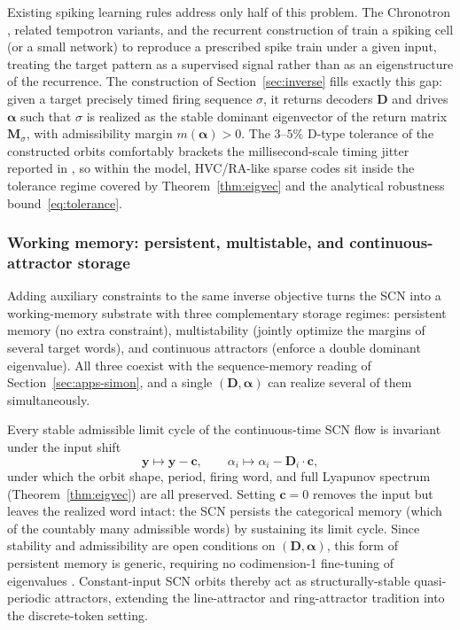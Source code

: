 \documentclass[12pt]{article}
\newcommand{\vv}[1]{\mathbf{#1}}
\newcommand{\DD}{\vv{D}}
\newcommand{\yy}{\vv{y}}
\begin{document}
Existing spiking learning rules address only half of this problem. The Chronotron \citep{florian2012chronotron}, related tempotron variants, and the recurrent construction of \citet{memmesheimer2014learning} train a spiking cell (or a small network) to reproduce a prescribed spike train under a given input, treating the target pattern as a supervised signal rather than as an eigenstructure of the recurrence. The construction of Section~\ref{sec:inverse} fills exactly this gap: given a target precisely timed firing sequence $\sigma$, it returns decoders $\vv{D}$ and drives $\boldsymbol{\alpha}$ such that $\sigma$ is realized as the stable dominant eigenvector of the return matrix $\vv{M}_\sigma$, with admissibility margin $m(\boldsymbol{\alpha})>0$. The $3$--$5\%$ D-type tolerance of the constructed orbits comfortably brackets the millisecond-scale timing jitter reported in \citet{tang2014millisecond,sober2018millisecond}, so within the model, HVC/RA-like sparse codes sit inside the tolerance regime covered by Theorem~\ref{thm:eigvec} and the analytical robustness bound~\eqref{eq:tolerance}.

\subsubsection{Working memory: persistent, multistable, and continuous-attractor storage}\label{sec:apps-wm}

Adding auxiliary constraints to the same inverse objective turns the SCN into a working-memory substrate with three complementary storage regimes: persistent memory (no extra constraint), multistability (jointly optimize the margins of several target words), and continuous attractors (enforce a double dominant eigenvalue). All three coexist with the sequence-memory reading of Section~\ref{sec:apps-simon}, and a single $(\vv{D},\boldsymbol{\alpha})$ can realize several of them simultaneously.

 Every stable admissible limit cycle of the continuous-time SCN flow is invariant under the input shift
\begin{equation}\label{eq:shift-invariance}
\yy\mapsto\yy-\vv{c},\qquad\alpha_i\mapsto\alpha_i-\DD_i\cdot\vv{c},
\end{equation}
under which the orbit shape, period, firing word, and full Lyapunov spectrum (Theorem~\ref{thm:eigvec}) are all preserved. Setting $\vv{c}=0$ removes the input but leaves the realized word intact: the SCN persists the categorical memory (which of the countably many admissible words) by sustaining its limit cycle. Since stability and admissibility are open conditions on $(\vv{D},\boldsymbol{\alpha})$, this form of persistent memory is generic, requiring no codimension-1 fine-tuning of eigenvalues \citep{Park2023a}. Constant-input SCN orbits thereby act as structurally-stable quasi-periodic attractors, extending the line-attractor \citep{seung1996brain} and ring-attractor \citep{benyishai1995theory} tradition into the discrete-token setting.
\end{document}
